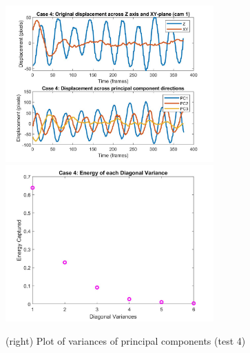 \documentclass{article}
\begin{document}
\begin{figure}[H]
\begin{center}
\includegraphics[width = 8cm]{oscmotion4}
\includegraphics[width = 8cm]{energy4}
\caption{\label{fig:scaled_diss} (left) Plots of original z displacement vs new basis (test4)}
\caption{\label{fig:scaled_diss} (right) Plot of variances of principal components (test 4)}
\end{center}
\end{figure}
\end{document}
